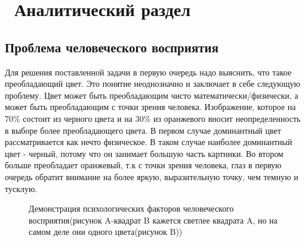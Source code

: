 \chapter{ Аналитический раздел}
\label{cha:analysis}
\section{ Проблема человеческого восприятия}
Для решения поставленной задачи в первую очередь надо выяснить, что такое преобладающий цвет. Это понятие неоднозначно и заключает в себе следующую проблему. Цвет может быть преобладающим чисто математически/физически, а может быть преобладающим с точки зрения человека. Изображение, которое на 70\% состоит из черного цвета и на 30\% из оранжевого вносит неопределенность в выборе более преобладающего цвета. В первом случае доминантный цвет рассматривается как нечто физическое. В таком случае наиболее доминантный цвет - черный, потому что он занимает большую часть картники. Во втором больше преобладает оранжевый, т.к с точки зрения человека, глаз в первую очередь обратит внимание на более яркую, выразительную точку, чем темную и тусклую.

\begin{figure}[ht!]
\end{figure}

\begin{figure}[ht!]%
    \centering
    \qquad
	\caption{Демонстрация психологических факторов человеческого восприятия(рисунок A-квадрат B кажется светлее квадрата A, но на самом деле они одного цвета(рисунок B))}%
\end{figure}

